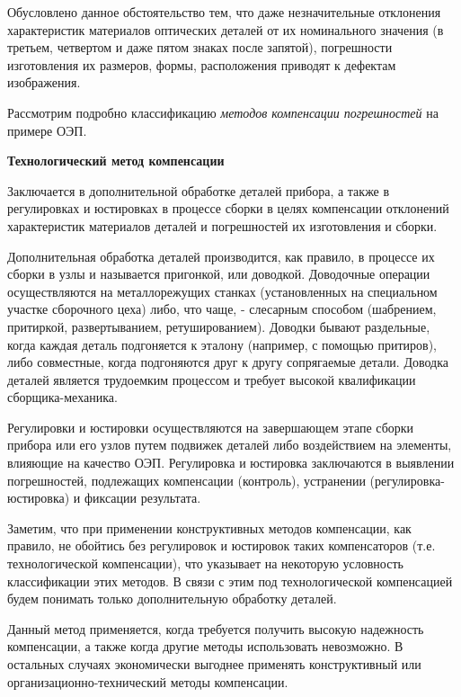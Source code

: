 Обусловлено данное обстоятельство тем, что даже незначительные отклонения характеристик материалов оптических деталей от их номинального значения (в третьем, четвертом и даже пятом знаках после запятой), погрешности изготовления их размеров, формы, расположения приводят к дефектам изображения.

Рассмотрим подробно классификацию \textit{методов компенсации погрешностей} на примере ОЭП.

\begin{flushleft}
\textbf{Технологический метод компенсации}
\end{flushleft}

Заключается в дополнительной обработке деталей прибора, а также в регулировках и юстировках в процессе сборки в целях компенсации отклонений характеристик материалов деталей и погрешностей их изготовления и сборки.

Дополнительная обработка деталей производится, как правило, в процессе их сборки в узлы и называется пригонкой, или доводкой. Доводочные операции осуществляются на металлорежущих станках (установленных на специальном участке сборочного цеха) либо, что чаще, - слесарным способом (шабрением, притиркой, развертыванием, ретушированием). Доводки бывают раздельные, когда каждая деталь подгоняется к эталону (например, с помощью притиров), либо совместные, когда подгоняются друг к другу сопрягаемые детали. Доводка деталей является трудоемким процессом и требует высокой квалификации сборщика-механика.

Регулировки и юстировки осуществляются на завершающем этапе сборки прибора или его узлов путем подвижек деталей либо воздействием на элементы, влияющие на качество ОЭП. Регулировка и юстировка заключаются в выявлении погрешностей, подлежащих компенсации (контроль), устранении (регулировка-юстировка) и фиксации результата.

Заметим, что при применении конструктивных методов компенсации, как правило, не обойтись без регулировок и юстировок таких компенсаторов (т.е. технологической компенсации), что указывает на некоторую условность классификации этих методов. В связи с этим под технологической компенсацией будем понимать только дополнительную обработку деталей.

Данный метод применяется, когда требуется получить высокую надежность компенсации, а также когда другие методы использовать невозможно. В остальных случаях экономически выгоднее применять конструктивный или организационно-технический методы компенсации.

